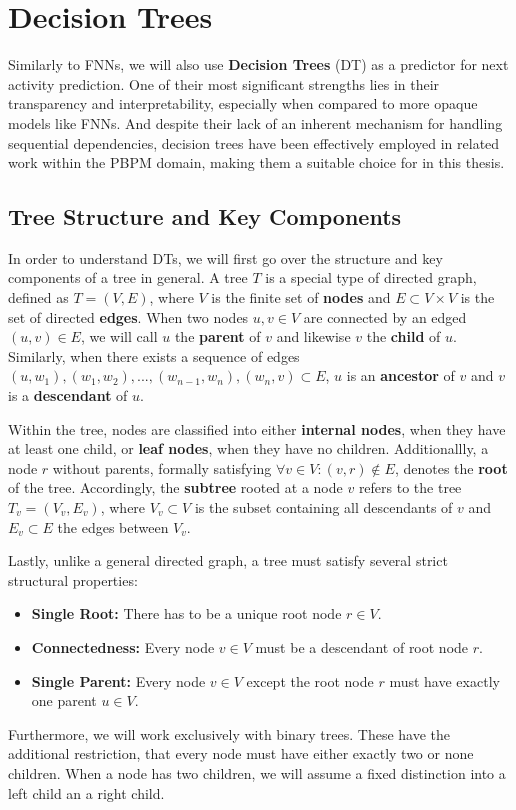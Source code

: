 

\section{Decision Trees}
\label{sec: dt}
Similarly to FNNs, we will also use \textbf{Decision Trees} (DT) as a predictor for next activity prediction.
One of their most significant strengths lies in their transparency and interpretability,
especially when compared to more opaque models like FNNs.
And despite their lack of an inherent mechanism for handling sequential dependencies,
decision trees have been effectively employed in related work \cite{fairness_foundation} within the PBPM domain,
making them a suitable choice for in this thesis. 

\subsection{Tree Structure and Key Components}
In order to understand DTs, we will first go over the structure and key components of a tree in general.
A tree $T$ is a special type of directed graph, defined as $T=(V,E)$,
where $V$ is the finite set of \textbf{nodes} and $E \subset V \times V$ is the set of directed \textbf{edges}.
When two nodes $u,v \in V$ are connected by an edged $(u,v) \in E$,
we will call $u$ the \textbf{parent} of $v$ and likewise $v$ the \textbf{child} of $u$.
Similarly, when there exists a sequence of edges $(u,w_1), (w_1,w_2), ..., (w_{n-1},w_n),(w_n, v) \subset E$,
$u$ is an \textbf{ancestor} of $v$ and $v$ is a \textbf{descendant} of $u$.

Within the tree, nodes are classified into either \textbf{internal nodes},
when they have at least one child, or \textbf{leaf nodes},
when they have no children.
Additionallly, a node $r$ without parents, formally satisfying $\forall v \in V: (v,r) \notin E$,
denotes the \textbf{root} of the tree.
Accordingly, the \textbf{subtree} rooted at a node $v$ refers to the tree $T_v = (V_v, E_v)$,
where $V_v \subset V$ is the subset containing all descendants of $v$ 
and $E_v \subset E$ the edges between $V_v$.

Lastly, unlike a general directed graph, a tree must satisfy several strict structural properties: \cite{trees}
\begin{itemize}
  \item \textbf{Single Root:} There has to be a unique root node $r \in V$.
  \item \textbf{Connectedness:} Every node $v \in V$ must be a descendant of root node $r$.
  \item \textbf{Single Parent:} Every node $v \in V$ except the root node $r$ must have exactly one parent $u \in V$.
\end{itemize}
Furthermore, we will work exclusively with binary trees.
These have the additional restriction, that every node must have either exactly two or none children.
When a node has two children, we will assume a fixed distinction into a left child an a right child.

